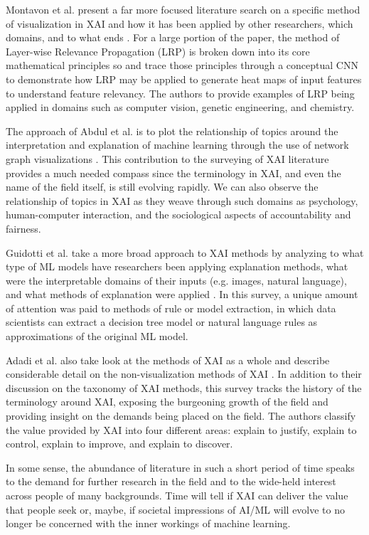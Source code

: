 Montavon et al. present a far more focused literature search on a specific method of visualization in XAI and how it has been applied by other researchers, which domains, and to what ends \cite{MONTAVON20181}.  For a large portion of the paper, the method of Layer-wise Relevance Propagation (LRP) is broken down into its core mathematical principles so and trace those principles through a conceptual CNN to demonstrate how LRP may be applied to generate heat maps of input features to understand feature relevancy.  The authors to provide examples of LRP being applied in domains such as computer vision, genetic engineering, and chemistry.

The approach of Abdul et al. is to plot the relationship of topics around the interpretation and explanation of machine learning through the use of network graph visualizations \cite{Abdul:2018:TTE:3173574.3174156}.  This contribution to the surveying of XAI literature provides a much needed compass since the terminology in XAI, and even the name of the field itself, is still evolving rapidly.  We can also observe the relationship of topics in XAI as they weave through such domains as psychology, human-computer interaction, and the sociological aspects of accountability and fairness.

Guidotti et al. take a more broad approach to XAI methods by analyzing to what type of ML models have researchers been applying explanation methods, what were the interpretable domains of their inputs (e.g. images, natural language), and what methods of explanation were applied \cite{Guidotti:2018:SME:3271482.3236009}.  In this survey, a unique amount of attention was paid to methods of rule or model extraction, in which data scientists can extract a decision tree model or natural language rules as approximations of the original ML model.

Adadi et al. also take look at the methods of XAI as a whole and describe considerable detail on the non-visualization methods of XAI \cite{Adadi2018}.  In addition to their discussion on the taxonomy of XAI methods, this survey tracks the history of the terminology around XAI, exposing the burgeoning growth of the field and providing insight on the demands being placed on the field.  The authors classify the value provided by XAI into four different areas: explain to justify, explain to control, explain to improve, and explain to discover.

In some sense, the abundance of literature in such a short period of time speaks to the demand for further research in the field and to the wide-held interest across people of many backgrounds.  Time will tell if XAI can deliver the value that people seek or, maybe, if societal impressions of AI/ML will evolve to no longer be concerned with the inner workings of machine learning.

